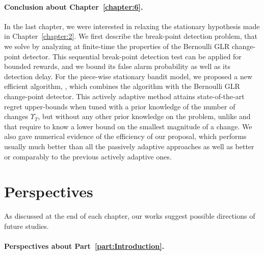 \paragraph{Conclusion about \textbf{Chapter~\ref{chapter:6}}.}

In the last chapter, we were interested in relaxing the stationary hypothesis made in Chapter~\ref{chapter:2}.
%
We first describe the break-point detection problem, that we solve by analyzing at finite-time the properties of the Bernoulli GLR change-point detector. This sequential break-point detection test can be applied for bounded rewards, and we bound its false alarm probability as well as its detection delay.
For the piece-wise stationary bandit model,
we proposed a new efficient algorithm, \GLRklUCB, which combines the \klUCB{} algorithm with the Bernoulli GLR change-point detector.
This actively adaptive method attains state-of-the-art regret upper-bounds when tuned with a prior knowledge of the number of changes $\Upsilon_T$, but without any other prior knowledge on the problem, unlike \CUSUMUCB{} and \MUCB{} that require to know a lower bound on the smallest magnitude of a change.
We also gave numerical evidence of the efficiency of our proposal, which performs usually much better than all the passively adaptive approaches as well as better or comparably to the previous actively adaptive ones.



\section{Perspectives}

As discussed at the end of each chapter,
our works suggest possible directions of future studies.





\paragraph{Perspectives about \textbf{Part~\ref{part:Introduction}}.}


